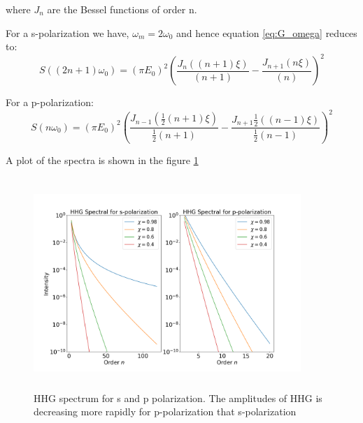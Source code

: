 \documentclass[12pt]{article}
\begin{document}
where $J_n$ are the Bessel functions of order n.

For a s-polarization we have, $\omega_m = 2 \omega_0$ and hence equation \ref{eq:G_omega} reduces to:
\begin{equation}
    \label{eq:s-spectrum}
    S((2n+1)\omega_0) = (\pi E_0)^2\left(\frac{J_n((n+1)\xi)}{(n+1)}- \frac{J_{n+1}(n\xi)}{(n)}\right)^2
\end{equation}

For a p-polarization:
\begin{equation}
    \label{eq:p-spectrum}
    S(n\omega_0) = (\pi E_0)^2\left(\frac{J_{n-1}(\frac{1}{2}(n+1)\xi)}{\frac{1}{2}(n+1)}- \frac{J_{n+1}\frac{1}{2}((n-1)\xi)}{\frac{1}{2}(n-1)}\right)^2
\end{equation}

A plot of the spectra is shown in the figure \ref{fig:spectrum}
\begin{figure}[h]
    \centering
    \includegraphics[width=0.9\textwidth, height=8cm]{images/spectrum.png}
    \caption{HHG spectrum for s and p polarization. The amplitudes of HHG is decreasing more rapidly for p-polarization that s-polarization}
    \label{fig:spectrum}
\end{figure}
\end{document}
